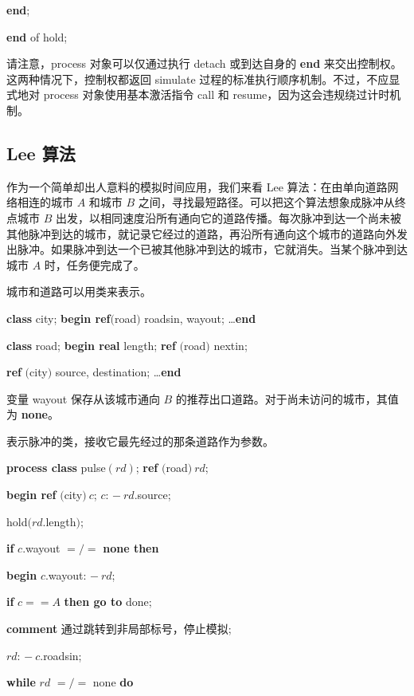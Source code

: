 \documentclass[twoside,11pt,fontset=none]{ctexbook}
\begin{document}
\quad \quad \textbf{end};

\quad \textbf{end} of hold;

\noindent
请注意，process 对象可以仅通过执行 detach 或到达自身的 \textbf{end} 来交出控制权。这两种情况下，控制权都返回 simulate 过程的标准执行顺序机制。不过，不应显式地对 process 对象使用基本激活指令 call 和 resume，因为这会违规绕过计时机制。

\subsection{Lee 算法}

作为一个简单却出人意料的模拟时间应用，我们来看 Lee 算法：在由单向道路网络相连的城市 $A$ 和城市 $B$ 之间，寻找最短路径。可以把这个算法想象成脉冲从终点城市 $B$ 出发，以相同速度沿所有通向它的道路传播。每次脉冲到达一个尚未被其他脉冲到达的城市，就记录它经过的道路，再沿所有通向这个城市的道路向外发出脉冲。如果脉冲到达一个已被其他脉冲到达的城市，它就消失。当某个脉冲到达城市 $A$ 时，任务便完成了。

城市和道路可以用类来表示。

\quad \textbf{class} city; \textbf{begin ref}$($road$)$ roadsin, wayout; \dots \textbf{end}

\quad \textbf{class} road; \textbf{begin real} length; \textbf{ref} $($road$)$ nextin;

\quad \quad \textbf{ref} $($city$)$ source, destination; \dots \textbf{end}

\noindent
变量 wayout 保存从该城市通向 $B$ 的推荐出口道路。对于尚未访问的城市，其值为 \textbf{none}。

表示脉冲的类，接收它最先经过的那条道路作为参数。

\quad \textbf{process class} pulse$(rd)$; \textbf{ref} $($road$)\ rd$;

\quad \textbf{begin ref} $($city$)\ c$; $c$: $-\ rd$.source;

\quad \quad hold$(rd$.length$)$;

\quad \quad \textbf{if} $c$.wayout $=/=$ \textbf{none then}

\quad \quad \textbf{begin} $c$.wayout: $-\ rd$;

\quad \quad \quad \textbf{if} $c == A$ \textbf{then go to} done;

\quad \quad \quad \textbf{comment} 通过跳转到非局部标号，停止模拟;

\quad \quad \quad $rd$: $-\ c$.roadsin;

\quad \quad \quad \textbf{while} $rd$ $=/=$ none \textbf{do}
\end{document}
